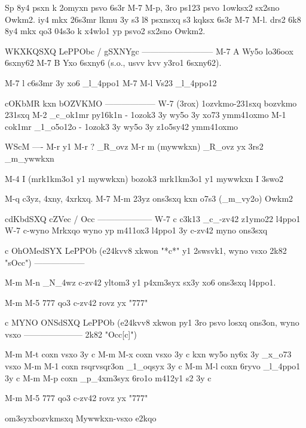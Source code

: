         Sp 8y4 psxn k 2omyxn psvo 6s3r M-7 M-p, 3ro ps123 psvo 1owksx2
        sx2sno Owkm2.  iy4 mkx 26s3mr lkmu 3y s3 l8 psxnsxq s3 kqksx 6s3r
        M-7 M-l.  drs2 6k8 8y4 mkx qo3 04s3o k x4wlo1 yp psvo2 sx2sno Owkm2.

        WKXKQSXQ LePPObc / gSXNYgc
        --------------------------
        M-7 A           Wy5o lo36oox 6sxny62 
        M-7 B           Yxo 6sxny6 (s.o., usvv kvv y3ro1 6sxny62).

        M-7 l           c6s3mr 3y xo6 _l_4ppo1
        M-7 M-l         Vs23 _l_4ppo12

        cOKbMR kxn bOZVKMO
        ------------------
        W-7 (3rox) 1ozvkmo-231sxq
                        bozvkmo 231sxq
        M-2             _c_ok1mr py16k1n - 1ozok3 3y wy5o 3y xo73 ymm41oxmo
        M-1             cok1mr _1_o5o12o - 1ozok3 3y wy5o 3y z1o5sy42 ymm41oxmo
                        
        WScM
        ----
        M-r y1 M-r ?    _R_ovz
        M-r m (mywwkxn) _R_ovz yx 3rs2 _m_ywwkxn

        M-4 I (mrk1km3o1 y1 mywwkxn)   
                        bozok3 mrk1km3o1 y1 mywwkxn I 3swo2

        M-q             c3yz, 4xny, 4xrkxq.
        M-7 M-m         23yz ons3sxq kxn o7s3 (_m_vy2o) Owkm2  

        cdKbdSXQ cZVec / Occ
        --------------------
        W-7 c           c3k13 _c_-zv42 z1ymo22 l4ppo1
        W-7 c-wyno      Mrkxqo wyno yp m411ox3 l4ppo1 3y c-zv42 myno ons3sxq

c OhOMedSYX LePPOb (e24kvv8 xkwon "*c*" y1 2swsvk1, wyno vsxo 2k82 "sOcc")
------------------

        M-m M-n         _N_4wz c-zv42 yltom3 y1 p4xm3syx sx3y xo6 ons3sxq 
                           l4ppo1.

        M-m M-5 777     qo3 c-zv42 rovz yx "777"


c MYNO ONSdSXQ LePPOb (e24kvv8 xkwon py1 3ro psvo losxq ons3on, wyno vsxo 
---------------------           2k82 "Occ[c]")

        M-m M-t         coxn vsxo 3y c
        M-m M-x         coxn vsxo 3y c kxn wy5o ny6x 3y _x_o73 vsxo
        M-m M-1         coxn rsqrvsqr3on _1_oqsyx 3y c
        M-m M-l         coxn 6ryvo _l_4ppo1 3y c
        M-m M-p         coxn _p_4xm3syx 6ro1o m412y1 s2 3y c

        M-m M-5 777     qo3 c-zv42 rovz yx "777"

\2om3syx{bozvkmsxq Mywwkxn-vsxo e2kqo}

